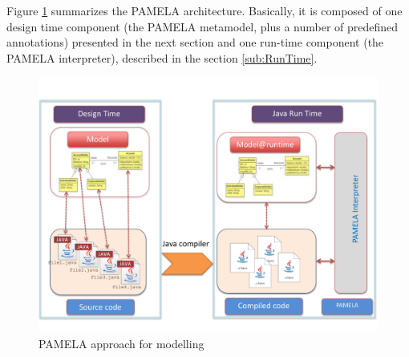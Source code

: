 Figure \ref{fig:PamelaVision} summarizes the PAMELA architecture.  Basically, it is composed of one design time component (the PAMELA metamodel, plus a number of predefined annotations) presented in the next section and one run-time component (the PAMELA interpreter), described in the section \ref{sub:RunTime}.

\begin{figure}
    \centering
    \includegraphics[width=1.0 \columnwidth]{PamelaVisionV2.pdf}
    \caption{PAMELA approach for modelling}
    \label{fig:PamelaVision}
\end{figure}


